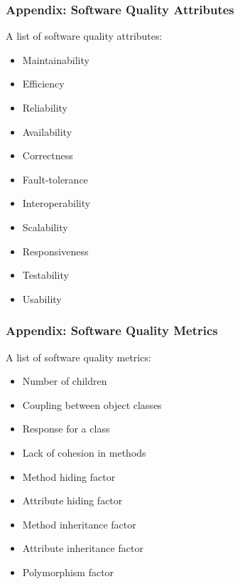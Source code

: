 \begin{frame}
\label{appendix:software_quality_attributes}
\frametitle{Appendix: Software Quality Attributes}

A list of software quality attributes:
\begin{example}
\begin{multicols}{2}
\begin{itemize}
  \item Maintainability
  \item Efficiency
  \item Reliability
  \item Availability
  \item Correctness
  \item Fault-tolerance
  \item Interoperability
  \item Scalability
  \item Responsiveness
  \item Testability
  \item Usability
\end{itemize}
\end{multicols}
\end{example}

\hyperlink{subsection:software_quality}{}

\end{frame}

\begin{frame}
\label{appendix:software_quality_metrics}
\frametitle{Appendix: Software Quality Metrics}

A list of software quality metrics:
\begin{example}
\begin{multicols}{2}
\begin{itemize}
  \item Number of children
  \item Coupling between object classes
  \item Response for a class
  \item Lack of cohesion in methods
  \item Method hiding factor
  \item Attribute hiding factor
  \item Method inheritance factor
  \item Attribute inheritance factor
  \item Polymorphism factor
\end{itemize}
\end{multicols}
\end{example}

\hyperlink{subsection:software_quality_metric}{}

\end{frame}